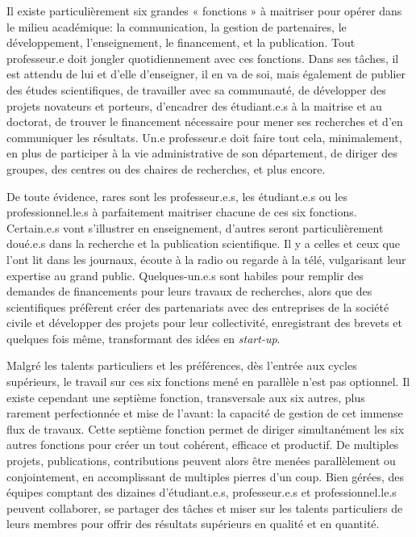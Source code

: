 \documentclass[
  letterpaper,
  DIV=11,
  numbers=noendperiod]{scrreprt}
\begin{document}
Il existe particulièrement six grandes « fonctions » à maitriser pour
opérer dans le milieu académique: la communication, la gestion de
partenaires, le développement, l'enseignement, le financement, et la
publication. Tout professeur.e doit jongler quotidiennement avec ces
fonctions. Dans ses tâches, il est attendu de lui et d'elle d'enseigner,
il en va de soi, mais également de publier des études scientifiques, de
travailler avec sa communauté, de développer des projets novateurs et
porteurs, d'encadrer des étudiant.e.s à la maitrise et au doctorat, de
trouver le financement nécessaire pour mener ses recherches et d'en
communiquer les résultats. Un.e professeur.e doit faire tout cela,
minimalement, en plus de participer à la vie administrative de son
département, de diriger des groupes, des centres ou des chaires de
recherches, et plus encore.

De toute évidence, rares sont les professeur.e.s, les étudiant.e.s ou
les professionnel.le.s à parfaitement maitriser chacune de ces six
fonctions. Certain.e.s vont s'illustrer en enseignement, d'autres seront
particulièrement doué.e.s dans la recherche et la publication
scientifique. Il y a celles et ceux que l'ont lit dans les journaux,
écoute à la radio ou regarde à la télé, vulgarisant leur expertise au
grand public. Quelques-un.e.s sont habiles pour remplir des demandes de
financements pour leurs travaux de recherches, alors que des
scientifiques préfèrent créer des partenariats avec des entreprises de
la société civile et développer des projets pour leur collectivité,
enregistrant des brevets et quelques fois même, transformant des idées
en \emph{start-up}.

Malgré les talents particuliers et les préférences, dès l'entrée aux
cycles supérieurs, le travail sur ces six fonctions mené en parallèle
n'est pas optionnel. Il existe cependant une septième fonction,
transversale aux six autres, plus rarement perfectionnée et mise de
l'avant: la capacité de gestion de cet immense flux de travaux. Cette
septième fonction permet de diriger simultanément les six autres
fonctions pour créer un tout cohérent, efficace et productif. De
multiples projets, publications, contributions peuvent alors être menées
parallèlement ou conjointement, en accomplissant de multiples pierres
d'un coup. Bien gérées, des équipes comptant des dizaines
d'étudiant.e.s, professeur.e.s et professionnel.le.s peuvent collaborer,
se partager des tâches et miser sur les talents particuliers de leurs
membres pour offrir des résultats supérieurs en qualité et en quantité.
\end{document}
